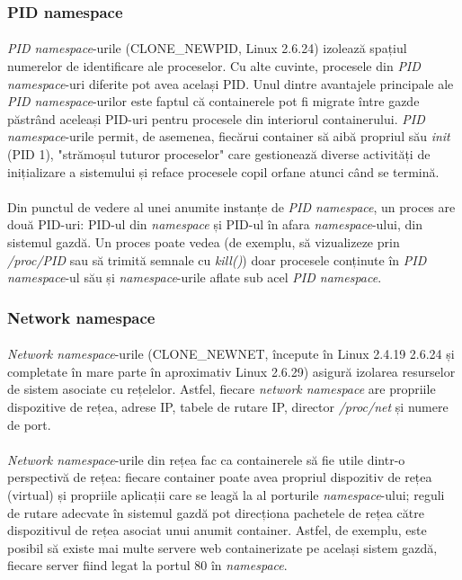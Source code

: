         \subsubsection{PID namespace}
            \paragraph{} \textit{PID namespace}-urile (CLONE\_NEWPID, Linux 2.6.24) izolează spațiul numerelor de identificare ale proceselor. Cu alte cuvinte, procesele din \textit{PID namespace}-uri diferite pot avea același PID. Unul dintre avantajele principale ale \textit{PID namespace}-urilor este faptul că containerele pot fi migrate între gazde păstrând aceleași PID-uri pentru procesele din interiorul containerului. \textit{PID namespace}-urile permit, de asemenea, fiecărui container să aibă propriul său \textit{init} (PID 1), "strămoșul tuturor proceselor" care gestionează diverse activități de inițializare a sistemului și reface procesele copil orfane atunci când se termină. \cite{ns:lwn}
            \paragraph{} Din punctul de vedere al unei anumite instanțe de \textit{PID namespace}, un proces are două PID-uri: PID-ul din \textit{namespace} și PID-ul în afara \textit{namespace}-ului, din sistemul gazdă. Un proces poate vedea (de exemplu, să vizualizeze prin \textit{/proc/PID} sau să trimită semnale cu \textit{kill()}) doar procesele conținute în \textit{PID namespace}-ul său și \textit{namespace}-urile aflate sub acel \textit{PID namespace}. \cite{ns:lwn}

        \subsubsection{Network namespace}
            \paragraph{} \textit{Network namespace}-urile (CLONE\_NEWNET, începute în Linux 2.4.19 2.6.24 și completate în mare parte în aproximativ Linux 2.6.29) asigură izolarea resurselor de sistem asociate cu rețelelor. Astfel, fiecare \textit{network namespace} are propriile dispozitive de rețea, adrese IP, tabele de rutare IP, director \textit{/proc/net} și numere de port. \cite{ns:lwn}
            \paragraph{} \textit{Network namespace}-urile din rețea fac ca containerele să fie utile dintr-o perspectivă de rețea: fiecare container poate avea propriul dispozitiv de rețea (virtual) și propriile aplicații care se leagă la al porturile  \textit{namespace}-ului; reguli de rutare adecvate în sistemul gazdă pot direcționa pachetele de rețea către dispozitivul de rețea asociat unui anumit container. Astfel, de exemplu, este posibil să existe mai multe servere web containerizate pe același sistem gazdă, fiecare server fiind legat la portul 80 în \textit{namespace}. \cite{ns:lwn}

